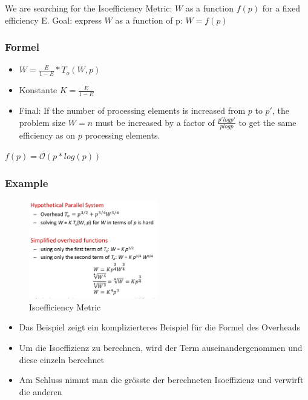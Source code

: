 We are searching for the Isoefficiency Metric: $W$ as a function $f(p)$ for
a fixed efficiency E. Goal: express $W$ as a function of p: \textbf{$W =
f(p)$}

\hypertarget{formel}{%
\subsubsection{Formel}\label{formel}}

\begin{itemize}
\tightlist
\item
  $W = \frac{E}{1-E} * T_o(W,p)$
\item
  Konstante $K = \frac{E}{1-E}$
\item
  Final: If the number of processing elements is increased from $p$ to $p'$,
  the problem size $W = n$ must be increased by a factor of $\frac{p' log p'}{p
  log p}$ to get the same efficiency as on $p$ processing elements.
\end{itemize}

\begin{tcolorbox}[colback=red!5!white,colframe=red!75!black]
$f(p) = \mathcal{O}(p * log(p))$
\end{tcolorbox}

\hypertarget{example}{%
\subsubsection{Example}\label{example}}

\begin{figure}[H]
\centering
\includegraphics[width=0.5\textwidth]{figures/isoefficiency_example.png}
\caption{Isoefficiency Metric}
\end{figure}

\begin{itemize}
\tightlist
\item
  Das Beispiel zeigt ein komplizierteres Beispiel für die Formel des
  Overheads
\item
  Um die Isoeffizienz zu berechnen, wird der Term auseinandergenommen
  und diese einzeln berechnet
\item
  Am Schluss nimmt man die grösste der berechneten Isoeffizienz und
  verwirft die anderen
\end{itemize}

